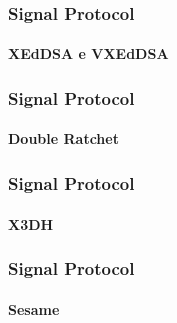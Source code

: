 
\begin{frame}
    \frametitle{Signal Protocol}
    \framesubtitle{XEdDSA e VXEdDSA}

    
\end{frame}

\begin{frame}
    \frametitle{Signal Protocol}
    \framesubtitle{Double Ratchet}


\end{frame}

\begin{frame}
    \frametitle{Signal Protocol}
    \framesubtitle{X3DH}


\end{frame}

\begin{frame}
    \frametitle{Signal Protocol}
    \framesubtitle{Sesame}


\end{frame}